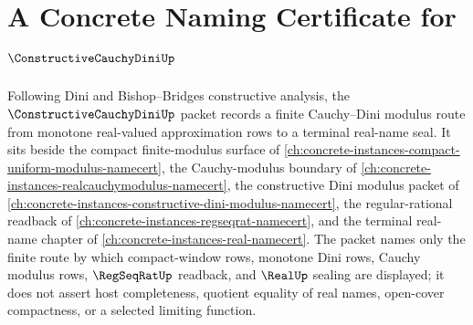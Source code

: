 \chapter{A Concrete Naming Certificate for $\ConstructiveCauchyDiniUp$}
\label{ch:concrete-instances-constructive-cauchy-dini-namecert}

Following Dini and Bishop--Bridges constructive analysis, the $\ConstructiveCauchyDiniUp$ packet records a finite Cauchy--Dini modulus route from monotone real-valued approximation rows to a terminal real-name seal. It sits beside the compact finite-modulus surface of \autoref{ch:concrete-instances-compact-uniform-modulus-namecert}, the Cauchy-modulus boundary of \autoref{ch:concrete-instances-realcauchymodulus-namecert}, the constructive Dini modulus packet of \autoref{ch:concrete-instances-constructive-dini-modulus-namecert}, the regular-rational readback of \autoref{ch:concrete-instances-regseqrat-namecert}, and the terminal real-name chapter of \autoref{ch:concrete-instances-real-namecert}. The packet names only the finite route by which compact-window rows, monotone Dini rows, Cauchy modulus rows, $\RegSeqRatUp$ readback, and $\RealUp$ sealing are displayed; it does not assert host completeness, quotient equality of real names, open-cover compactness, or a selected limiting function.

